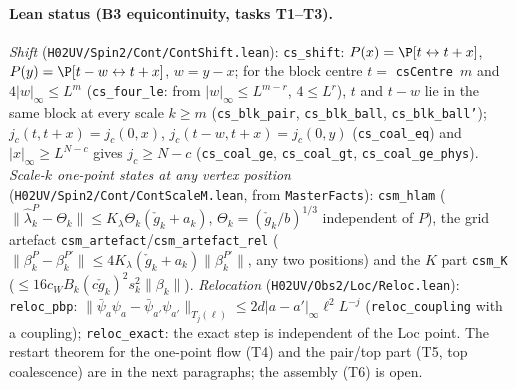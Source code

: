 \documentclass[11pt]{amsart}
\theoremstyle{definition}
\theoremstyle{remark}
\numberwithin{equation}{section}
\begin{document}
\paragraph{Lean status (B3 equicontinuity, tasks T1--T3).}
\emph{Shift} (\texttt{H02UV/Spin2/Cont/ContShift.lean}): \texttt{cs\_shift}: $P(x)=\P[t\leftrightarrow t+x]$,
$P(y)=\P[t-w\leftrightarrow t+x]$, $w=y-x$; for the block centre $t=$ \texttt{csCentre}~$m$ and
$4|w|_\infty\le L^m$ (\texttt{cs\_four\_le}: from $|w|_\infty\le L^{m-r}$, $4\le L^r$), $t$ and $t-w$ lie in
the same block at every scale $k\ge m$ (\texttt{cs\_blk\_pair}, \texttt{cs\_blk\_ball}, \texttt{cs\_blk\_ball'});
$j_c(t,t+x)=j_c(0,x)$, $j_c(t-w,t+x)=j_c(0,y)$ (\texttt{cs\_coal\_eq}) and $|x|_\infty\ge L^{N-c}$ gives
$j_c\ge N-c$ (\texttt{cs\_coal\_ge}, \texttt{cs\_coal\_gt}, \texttt{cs\_coal\_ge\_phys}).
\emph{Scale-$k$ one-point states at any vertex position} (\texttt{H02UV/Spin2/Cont/ContScaleM.lean}, from \texttt{MasterFacts}):
\texttt{csm\_hlam} ($\|\hat\lambda^P_k-\Theta_k\|\le K_\lambda\Theta_k(\check g_k+a_k)$, $\Theta_k=(\check g_k/b)^{1/3}$
independent of $P$), the grid artefact \texttt{csm\_artefact}/\texttt{csm\_artefact\_rel}
($\|\beta^P_k-\beta^{P'}_k\|\le4K_\lambda(\check g_k+a_k)\|\beta^{P'}_k\|$, any two positions) and the $K$ part
\texttt{csm\_K} ($\le16c_WB_k(c\check g_k)^2s_k^2\|\beta_k\|$).
\emph{Relocation} (\texttt{H02UV/Obs2/Loc/Reloc.lean}): \texttt{reloc\_pbp}:
$\|\bar\psi_a\psi_a-\bar\psi_{a'}\psi_{a'}\|_{T_j(\ell)}\le2d|a-a'|_\infty\ell^2L^{-j}$ (\texttt{reloc\_coupling} with a
coupling); \texttt{reloc\_exact}: the exact step is independent of the Loc point. The restart theorem
for the one-point flow (T4) and the pair/top part (T5, top coalescence) are in the next paragraphs; the assembly (T6) is open.
\end{document}
